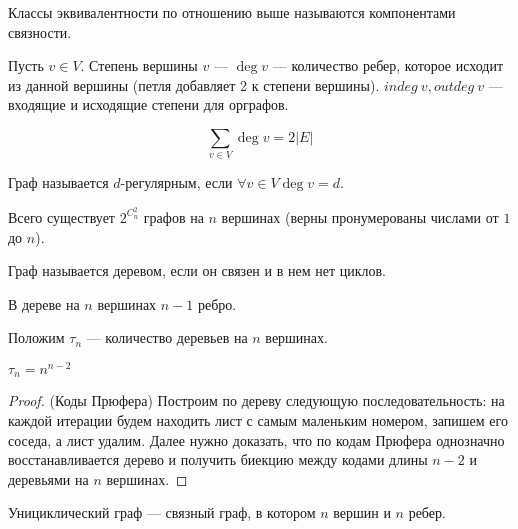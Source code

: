 \begin{definition}
    Классы эквивалентности по отношению выше называются компонентами связности.
\end{definition}

\begin{definition}
    Пусть \(v \in V\). Степень вершины \(v\) --- \(\deg v\) --- количество ребер, которое исходит из данной вершины (петля добавляет 2 к степени вершины). \(indeg\ v, outdeg\ v\) --- входящие и исходящие степени для орграфов.
\end{definition}

\begin{note}
    \[\sum_{v \in V} \deg v = 2|E|\]
\end{note}

\begin{definition}
    Граф называется \(d\)-регулярным, если \(\forall v \in V \deg v = d\).
\end{definition}

\begin{note}
    Всего существует \(2^{C_n^2}\) графов на \(n\) вершинах (верны пронумерованы числами от \(1\) до \(n\)).
\end{note}

\begin{definition}
    Граф называется деревом, если он связен и в нем нет циклов.
\end{definition}

\begin{note}
    В дереве на \(n\) вершинах \(n - 1\) ребро.
\end{note}

Положим \(\tau_n\) --- количество деревьев на \(n\) вершинах.

\begin{proposition}
    \(\tau_n = n^{n - 2}\)
\end{proposition}
\begin{proof}(Коды Прюфера)
    Построим по дереву следующую последовательность: на каждой итерации будем находить лист с самым маленьким номером, запишем его соседа, а лист удалим. Далее нужно доказать, что по кодам Прюфера однозначно восстанавливается дерево и получить биекцию между кодами длины \(n - 2\) и деревьями на \(n\) вершинах.
\end{proof}

\begin{definition}
    Унициклический граф --- связный граф, в котором \(n\) вершин и \(n\) ребер.
\end{definition}

